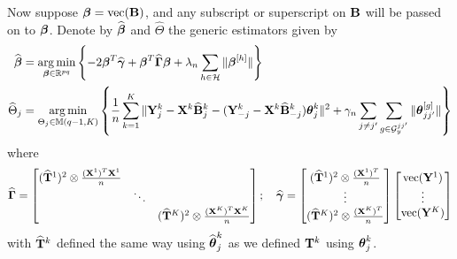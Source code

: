\documentclass[12pt, letterpaper]{article}
\DeclareMathOperator*{\ve}{vec}
\DeclareMathOperator*{\argmin}{arg\,min}
\numberwithin{equation}{section}
\begin{document}
Now suppose $\bfbeta = \ve (\bfB)$, and any subscript or superscript on ${\mathbf{B}}$ will be passed on to ${\boldsymbol{\beta}}$. Denote by $\widehat {{\boldsymbol{\beta}}}$ and $\widehat \Theta$ the generic estimators given by
%
\begin{align}
\widehat \bfbeta &= \argmin_{\bfbeta \in \BR^{pq}} \left\{-2 \bfbeta^T \widehat \bfgamma + \bfbeta^T \widehat \bfGamma \bfbeta + \lambda_n \sum_{h \in \cH} \| \bfbeta^{[h]}  \| \right\} \label{eqn:EstEqn1}\\
\widehat \Theta_j &= \argmin_{\Theta_j \in \BM(q-1, K)} \left\{ \frac{1}{n} \sum_{k=1}^K \| \bfY^k_j - \bfX^k \widehat \bfB_j^k - (\bfY_{-j}^k - \bfX^k \widehat \bfB^k_{-j} ) \bftheta_j^k \|^2 + \gamma_n \sum_{j \neq j'} \sum_{g \in \cG_y^{jj'}} \| \bftheta_{jj'}^{[g]} \| \right\} \label{eqn:EstEqn2}
\end{align}
%
where
%
$$
\widehat \bfGamma = \begin{bmatrix}
(\widehat \bfT^1)^2 \otimes \frac{(\bfX^1)^T \bfX^1}{n} & &\\
& \ddots &\\
& & (\widehat \bfT^K)^2 \otimes \frac{(\bfX^K)^T \bfX^K}{n}
\end{bmatrix}; \quad
\widehat \bfgamma = \begin{bmatrix}
(\widehat \bfT^1)^2 \otimes \frac{(\bfX^1)^T}{n}\\
\vdots\\
(\widehat \bfT^K)^2 \otimes \frac{(\bfX^K)^T}{n}
\end{bmatrix}
\begin{bmatrix}
\ve (\bfY^1)\\
\vdots\\
\ve (\bfY^K)
\end{bmatrix}
$$
with $\widehat {{\mathbf{T}}}^k$ defined the same way using $\widehat {{\boldsymbol{\theta}}}_j^k$ as we defined ${\mathbf{T}}^k$ using ${\boldsymbol{\theta}}_j^k$.
\end{document}
